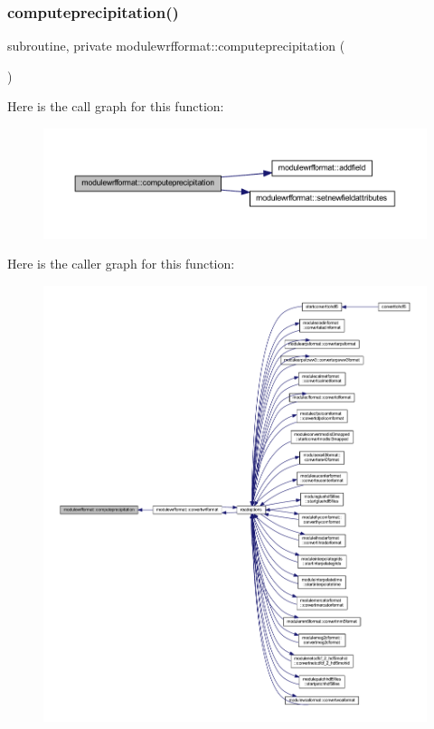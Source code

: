 \subsubsection{\texorpdfstring{computeprecipitation()}{computeprecipitation()}}
{\footnotesize\ttfamily subroutine, private modulewrfformat\+::computeprecipitation (\begin{DoxyParamCaption}{ }\end{DoxyParamCaption})\hspace{0.3cm}{\ttfamily [private]}}

Here is the call graph for this function\+:\nopagebreak
\begin{figure}[H]
\begin{center}
\leavevmode
\includegraphics[width=350pt]{namespacemodulewrfformat_a1c8f24f66c6b703ada552c472d71569d_cgraph}
\end{center}
\end{figure}
Here is the caller graph for this function\+:\nopagebreak
\begin{figure}[H]
\begin{center}
\leavevmode
\includegraphics[width=350pt]{namespacemodulewrfformat_a1c8f24f66c6b703ada552c472d71569d_icgraph}
\end{center}
\end{figure}
\mbox{\label{namespacemodulewrfformat_a9cb17629d782fef1666ac25cfe816e5e}} 

